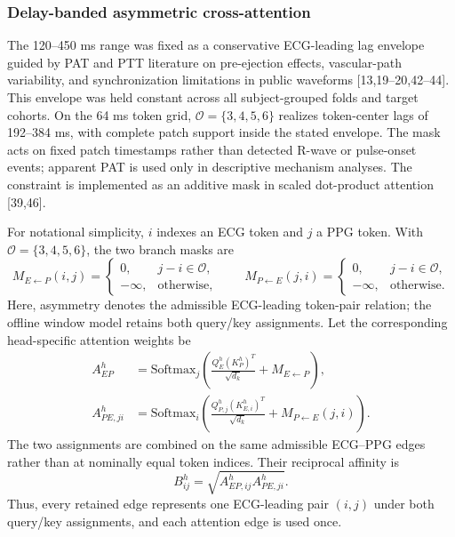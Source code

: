 \documentclass[preprint,12pt]{elsarticle}
\begin{document}
\subsubsection{Delay-banded asymmetric cross-attention}

The 120--450 ms range was fixed as a conservative ECG-leading lag envelope guided by PAT and PTT literature on pre-ejection effects, vascular-path variability, and synchronization limitations in public waveforms [13,19--20,42--44]. This envelope was held constant across all subject-grouped folds and target cohorts. On the 64 ms token grid, $\mathcal{O}=\{3,4,5,6\}$ realizes token-center lags of 192--384 ms, with complete patch support inside the stated envelope. The mask acts on fixed patch timestamps rather than detected R-wave or pulse-onset events; apparent PAT is used only in descriptive mechanism analyses. The constraint is implemented as an additive mask in scaled dot-product attention [39,46].

For notational simplicity, $i$ indexes an ECG token and $j$ a PPG token. With $\mathcal{O}=\{3,4,5,6\}$, the two branch masks are
\begin{equation}
M_{E\leftarrow P}(i,j)=
\begin{cases}
0, & j-i\in\mathcal{O},\\
-\infty, & \mathrm{otherwise},
\end{cases}
\qquad
M_{P\leftarrow E}(j,i)=
\begin{cases}
0, & j-i\in\mathcal{O},\\
-\infty, & \mathrm{otherwise}.
\end{cases}
\end{equation}
Here, asymmetry denotes the admissible ECG-leading token-pair relation; the offline window model retains both query/key assignments. Let the corresponding head-specific attention weights be
\begin{align}
A^{h}_{EP} &= \mathrm{Softmax}_j\left(\frac{Q_E^h(K_P^h)^T}{\sqrt{d_k}} + M_{E\leftarrow P}\right),\\
A^{h}_{PE,ji} &= \mathrm{Softmax}_i\left(\frac{Q_{P,j}^h(K_{E,i}^h)^T}{\sqrt{d_k}} + M_{P\leftarrow E}(j,i)\right).
\end{align}
The two assignments are combined on the same admissible ECG--PPG edges rather than at nominally equal token indices. Their reciprocal affinity is
\begin{equation}
B^h_{ij}=\sqrt{A^h_{EP,ij}A^h_{PE,ji}}.
\end{equation}
Thus, every retained edge represents one ECG-leading pair $(i,j)$ under both query/key assignments, and each attention edge is used once.
\end{document}
